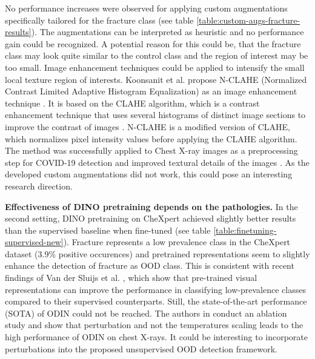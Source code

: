 No performance increases were observed for applying custom augmentations specifically tailored for the fracture class (see table \ref{table:custom-augs-fracture-results}).
The augmentations can be interpreted as heuristic and no performance gain could be recognized.
A potential reason for this could be, that the fracture class may look quite similar to the control class and the region of interest may be too small. 
Image enhancement techniques could be applied to intensify the small local texture region of interests.
Koonsanit et al. propose N-CLAHE (Normalized Contrast Limited Adaptive Histogram Equalization) as an image enhancement technique \citep{Koonsanit2017}.
It is based on the CLAHE algorithm, which is a contrast enhancement technique that uses several histograms of distinct image sections to improve the contrast of images \citep{Zuiderveld1994}.
N-CLAHE is a modified version of CLAHE, which normalizes pixel intensity values before applying the CLAHE algorithm.
The method was successfully applied to Chest X-ray images as a preprocessing step for COVID-19 detection and improved textural details of the images \citep{Horry2020}.
As the developed custom augmentations did not work, this could pose an interesting research direction.
\par
\textbf{Effectiveness of DINO pretraining depends on the pathologies.} 
In the second setting, DINO pretraining on CheXpert achieved slightly better results than the supervised baseline when fine-tuned (see table \ref{table:finetuning-supervised-new}).
Fracture represents a low prevalence class in the CheXpert dataset (3.9\% positive occurences) and pretrained representations seem to slightly enhance the detection of fracture as OOD class.
This is consistent with recent findings of Van der Sluijs et al. \citep{Vandersluijs2023}, which show that pre-trained visual representations can improve the performance in classifying low-prevalence classes compared to their supervised counterparts.
Still, the state-of-the-art performance (SOTA) of ODIN could not be reached.
The authors in \citep{Berger2021} conduct an ablation study and show that perturbation and not the temperatures scaling leads to the high performance of ODIN on chest X-rays.
It could be interesting to incorporate perturbations into the proposed unsupervised OOD detection framework.
